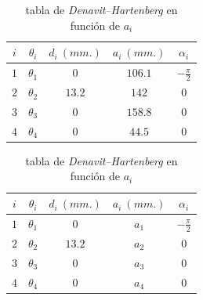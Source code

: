 \documentclass[a4paper,12pt]{article}
\begin{document}
\begin{table}[H]
    \parbox{.45\linewidth}{
        \centering
        \begin{tabular}{ c | c c c c }
            $i$ & $\theta_i$ & $d_i~(mm.)$ & $a_i~(mm.)$ & $\alpha_i$ \\ [0.5ex]
            \hline
            $1$ & $\theta_1$ & $0$ & $106.1$ & $-\frac{\pi}{2}$ \\
            $2$ & $\theta_2$ & $13.2$ & $142$ & $0$ \\
            $3$ & $\theta_3$ & $0$ & $158.8$ & $0$ \\
            $4$ & $\theta_4$ & $0$ & $44.5$ & $0$ \\ [1ex]
        \end{tabular}
        \caption{tabla de \textit{Denavit–Hartenberg}}
    }
    \hfill
    \parbox{.45\linewidth}{
        \centering
        \begin{tabular}{ c | c c c c }
            $i$ & $\theta_i$ & $d_i~(mm.)$ & $a_i~(mm.)$ & $\alpha_i$ \\ [0.5ex]
            \hline
            $1$ & $\theta_1$ & $0$ & $a_1$ & $-\frac{\pi}{2}$ \\
            $2$ & $\theta_2$ & $13.2$ & $a_2$ & $0$ \\
            $3$ & $\theta_3$ & $0$ & $a_3$ & $0$ \\
            $4$ & $\theta_4$ & $0$ & $a_4$ & $0$ \\ [1ex]
        \end{tabular}
        \caption{tabla de \textit{Denavit–Hartenberg} en función de $a_i$}
    }
\end{table}

\newpage
\printbibliography
\end{document}

